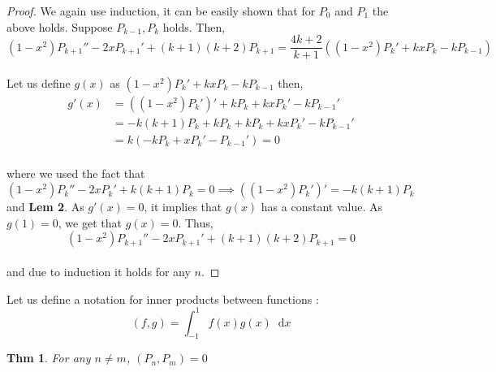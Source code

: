 \documentclass[paper=a4, fontsize=11pt]{scrartcl}
\newcommand*\dif{\mathop{}\!\mathrm{d}}
\newtheorem{theorem}{Thm}
\begin{document}
\begin{proof}
We again use induction, it can be easily shown that for $P_0$ and $P_1$ the above holds. Suppose $P_{k-1},P_{k}$ holds. Then,\\

\begin{equation}\nonumber
	(1-x^2)P_{k+1}'' - 2x P_{k+1}' + (k+1)(k+2) P_{k+1} = \frac{4k+2}{k+1} \left( (1-x^2)P_k' + kxP_{k} -k P_{k-1} \right)
\end{equation}\\

Let us define $g(x)$ as $(1-x^2)P_k' + kxP_{k} -k P_{k-1} $ then, \\

\begin{equation}\nonumber
	\begin{split}
	 g'(x) &= ((1-x^2)P_k')' + kP_k +kxP_k' - kP_{k-1}' \\[2.5ex]
	 &= -k(k+1)P_k + kP_k + kP_k +kxP_k' - kP_{k-1}' \\[2.5ex]
	 &= k(-kP_k +x P_k ' - P_{k-1}')=0
	\end{split}
\end{equation}\\

where we used the fact that $(1-x^2)P_k'' - 2x P_k' + k(k+1) P_k =0 \implies ((1-x^2)P_k ')' = -k(k+1) P_k$ and \textbf{Lem 2}. As $g'(x)=0$, it implies that $g(x)$ has a constant value. As $g(1)=0$, we get that $g(x)=0$. Thus, \\

\begin{equation}\nonumber
	(1-x^2)P_{k+1}'' - 2x P_{k+1}' + (k+1)(k+2) P_{k+1} = 0
\end{equation}\\

and due to induction it holds for any $n$.
\end{proof}
\vspace{0.15in}

Let us define a notation for inner products between functions : \\

\begin{equation}\nonumber
	(f,g) = \int_{-1}^1 f(x) g(x) \dif x
\end{equation}

\begin{theorem}
For any $n\neq m$, $(P_n,P_m)=0$
\end{theorem}
\end{document}
